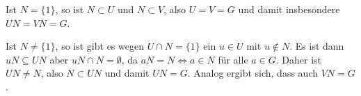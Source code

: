 \documentclass[a4paper,10pt]{article}
\theoremstyle{definition}
\begin{document}
Ist $N = \{1\}$, so ist $N \subset U$ und $N \subset V$, also $U=V=G$ und damit insbesondere $UN=VN=G$.

Ist $N \neq \{1\}$, so ist gibt es wegen $U \cap N = \{1\}$ ein $u \in U$ mit $u \not \in N$. Es ist dann $uN \subseteq{UN}$ aber $uN \cap N = \emptyset$, da $aN = N \Leftrightarrow a \in N$ für alle $a \in G$. Daher ist $UN \neq N$, also $N \subset UN$ und damit $UN = G$. Analog ergibt sich, dass auch $VN = G$.
\end{document}
